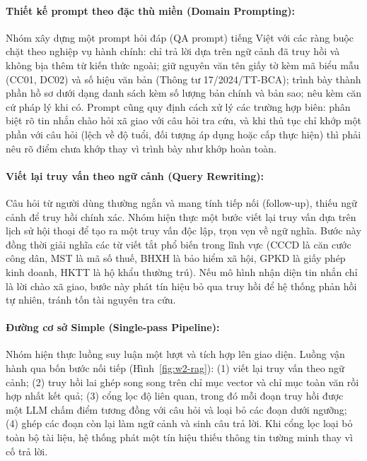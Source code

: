 \documentclass[11pt]{article}
\begin{document}
\paragraph{Thiết kế prompt theo đặc thù miền (Domain Prompting): }
Nhóm xây dựng một prompt hỏi đáp (QA prompt) tiếng Việt với các ràng buộc chặt theo nghiệp vụ
hành chính: chỉ trả lời dựa trên ngữ cảnh đã truy hồi và không bịa thêm từ kiến thức ngoài;
giữ nguyên văn tên giấy tờ kèm mã biểu mẫu (CC01, DC02) và số hiệu văn bản (Thông tư
17/2024/TT-BCA); trình bày thành phần hồ sơ dưới dạng danh sách kèm số lượng bản chính và bản
sao; nêu kèm căn cứ pháp lý khi có. Prompt cũng quy định cách xử lý các trường hợp biên: phân
biệt rõ tin nhắn chào hỏi xã giao với câu hỏi tra cứu, và khi thủ tục chỉ khớp một phần với
câu hỏi (lệch về độ tuổi, đối tượng áp dụng hoặc cấp thực hiện) thì phải nêu rõ điểm chưa khớp
thay vì trình bày như khớp hoàn toàn.

\paragraph{Viết lại truy vấn theo ngữ cảnh (Query Rewriting): }
Câu hỏi từ người dùng thường ngắn và mang tính tiếp nối (follow-up), thiếu ngữ cảnh để truy
hồi chính xác. Nhóm hiện thực một bước viết lại truy vấn dựa trên lịch sử hội thoại để tạo ra
một truy vấn độc lập, trọn vẹn về ngữ nghĩa. Bước này đồng thời giải nghĩa các từ viết tắt phổ
biến trong lĩnh vực (CCCD là căn cước công dân, MST là mã số thuế, BHXH là bảo hiểm xã hội,
GPKD là giấy phép kinh doanh, HKTT là hộ khẩu thường trú). Nếu mô hình nhận diện tin nhắn chỉ
là lời chào xã giao, bước này phát tín hiệu bỏ qua truy hồi để hệ thống phản hồi tự nhiên,
tránh tốn tài nguyên tra cứu.


\paragraph{Đường cơ sở Simple (Single-pass Pipeline): }
Nhóm hiện thực luồng suy luận một lượt và tích hợp lên giao diện. Luồng vận hành qua bốn bước
nối tiếp (Hình~\ref{fig:w2-rag}): (1) viết lại truy vấn theo ngữ cảnh; (2) truy hồi lai ghép
song song trên chỉ mục vector và chỉ mục toàn văn rồi hợp nhất kết quả; (3) cổng lọc độ liên
quan, trong đó mỗi đoạn truy hồi được một LLM chấm điểm tương đồng với câu hỏi và loại bỏ các
đoạn dưới ngưỡng; (4) ghép các đoạn còn lại làm ngữ cảnh và sinh câu trả lời. Khi cổng lọc loại
bỏ toàn bộ tài liệu, hệ thống phát một tín hiệu thiếu thông tin tường minh thay vì cố trả lời.
\end{document}
